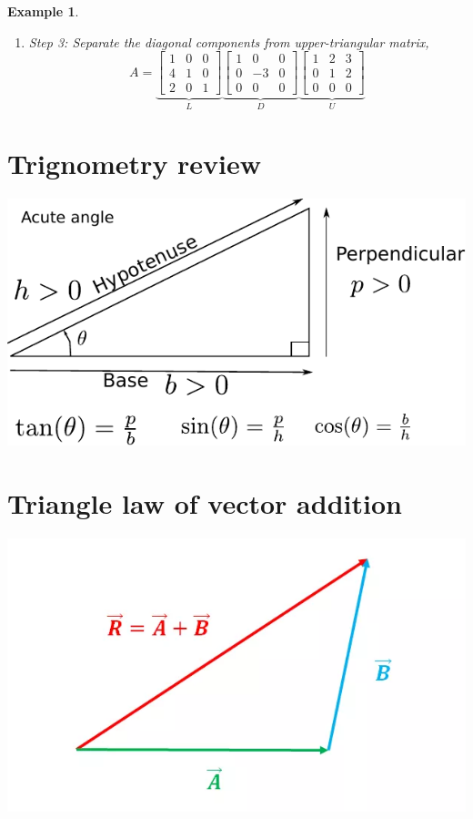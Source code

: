 \documentclass[twocolumn]{article}
\newtheorem{example}{Example}
\begin{document}
\begin{example}
\begin{enumerate}
    \item  Step   3:  Separate  the diagonal components  from upper-triangular matrix,
    \[
      A   
      =   \underbrace{\begin{bmatrix}
        1 & 0  &  0 \\
        4  &  1 &  0  \\
        2  &  0 &  1
      \end{bmatrix}}_{L}
      \underbrace{\begin{bmatrix}
        1 & 0 &  0  \\
        0 & -3 &  0 \\
        0 & 0 &  0
      \end{bmatrix}}_{D}
      \underbrace{\begin{bmatrix}
        1 & 2 &  3  \\
        0 & 1 &  2 \\
        0 & 0 &  0
      \end{bmatrix}}_{U}
    \]
\end{enumerate}
\end{example}



\section{Trignometry review}
\includegraphics[width=\linewidth]{media/trig.pdf}

\section{Triangle law of vector addition}
\includegraphics[width=\linewidth]{media/triangle-law.png}
\end{document}

